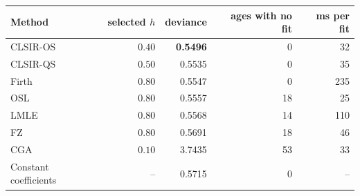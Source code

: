 \begin{tabular}{lrrrr}
\toprule
Method & selected $h$ & deviance & ages with no fit & ms per fit\\
\midrule
CLSIR-OS & $0.40$ & \textbf{0.5496} & 0 & 32\\
CLSIR-QS & $0.50$ & 0.5535 & 0 & 35\\
Firth & $0.80$ & 0.5547 & 0 & 235\\
OSL & $0.80$ & 0.5557 & 18 & 25\\
LMLE & $0.80$ & 0.5568 & 14 & 110\\
FZ & $0.80$ & 0.5691 & 18 & 46\\
CGA & $0.10$ & 3.7435 & 53 & 33\\
\addlinespace
Constant coefficients & -- & 0.5715 & 0 & --\\
\bottomrule
\end{tabular}

